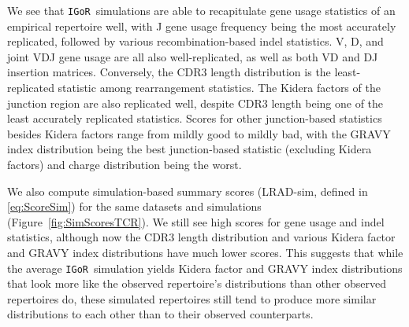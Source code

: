 \documentclass{article}
\newcommand{\igor}{\texttt{IGoR}}
\begin{document}
We see that \igor\ simulations are able to recapitulate gene usage statistics of an empirical repertoire well, with J gene usage frequency being the most accurately replicated, followed by various recombination-based indel statistics.
V, D, and joint VDJ gene usage are all also well-replicated, as well as both VD and DJ insertion matrices.
Conversely, the CDR3 length distribution is the least-replicated statistic among rearrangement statistics.
The Kidera factors of the junction region are also replicated well, despite CDR3 length being one of the least accurately replicated statistics.
Scores for other junction-based statistics besides Kidera factors range from mildly good to mildly bad, with the GRAVY index distribution being the best junction-based statistic (excluding Kidera factors) and charge distribution being the worst.

We also compute simulation-based summary scores (LRAD-sim, defined in \eqref{eq:ScoreSim}) for the same datasets and simulations (Figure~\ref{fig:SimScoresTCR}).
We still see high scores for gene usage and indel statistics, although now the CDR3 length distribution and various Kidera factor and GRAVY index distributions have much lower scores.
This suggests that while the average \igor\ simulation yields Kidera factor and GRAVY index distributions that look more like the observed repertoire's distributions than other observed repertoires do, these simulated repertoires still tend to produce more similar distributions to each other than to their observed counterparts.
\end{document}

